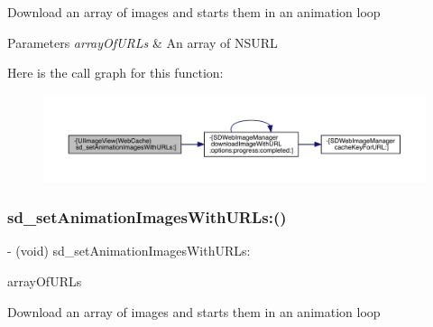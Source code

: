 Download an array of images and starts them in an animation loop


\begin{DoxyParams}{Parameters}
{\em array\+Of\+U\+R\+Ls} & An array of N\+S\+U\+RL \\
\hline
\end{DoxyParams}
Here is the call graph for this function\+:\nopagebreak
\begin{figure}[H]
\begin{center}
\leavevmode
\includegraphics[width=350pt]{category_u_i_image_view_07_web_cache_08_a3d9c6bf83abb348e4130429f2087b8af_cgraph}
\end{center}
\end{figure}
\mbox{\label{category_u_i_image_view_07_web_cache_08_a3d9c6bf83abb348e4130429f2087b8af}} 
\subsubsection{\texorpdfstring{sd\+\_\+set\+Animation\+Images\+With\+U\+R\+Ls\+:()}{sd\_setAnimationImagesWithURLs:()}\hspace{0.1cm}{\footnotesize\ttfamily [3/3]}}
{\footnotesize\ttfamily -\/ (void) sd\+\_\+set\+Animation\+Images\+With\+U\+R\+Ls\+: \begin{DoxyParamCaption}\item[{(N\+S\+Array $\ast$)}]{array\+Of\+U\+R\+Ls }\end{DoxyParamCaption}}

Download an array of images and starts them in an animation loop


